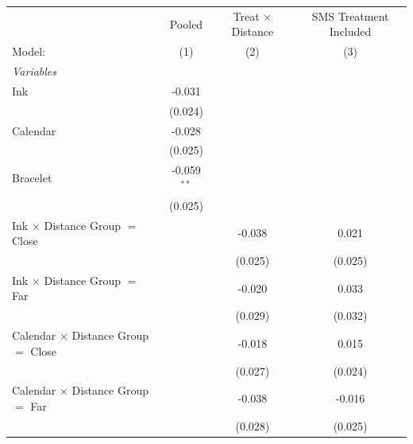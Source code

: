 
 
\caption{\label{tab:attrition-treatment} Differential Attrition from Knowledge Table by Treatment Assignment}
\centering
\begin{tabular}{lccc}
   \tabularnewline \midrule \midrule
                                               & Pooled        & Treat $\times$ Distance  & SMS Treatment Included \\   
   Model:                                      & (1)           & (2)                      & (3)\\  
   \midrule
   \emph{Variables}\\
   Ink                                         & -0.031        &                          &   \\   
                                               & (0.024)       &                          &   \\   
   Calendar                                    & -0.028        &                          &   \\   
                                               & (0.025)       &                          &   \\   
   Bracelet                                    & -0.059$^{**}$ &                          &   \\   
                                               & (0.025)       &                          &   \\   
   Ink $\times$ Distance Group $=$ Close       &               & -0.038                   & 0.021\\   
                                               &               & (0.025)                  & (0.025)\\   
   Ink $\times$ Distance Group $=$ Far         &               & -0.020                   & 0.033\\   
                                               &               & (0.029)                  & (0.032)\\   
   Calendar $\times$ Distance Group $=$ Close  &               & -0.018                   & 0.015\\   
                                               &               & (0.027)                  & (0.024)\\   
   Calendar $\times$ Distance Group $=$ Far    &               & -0.038                   & -0.016\\   
                                               &               & (0.028)                  & (0.025)\\   

\end{tabular}

